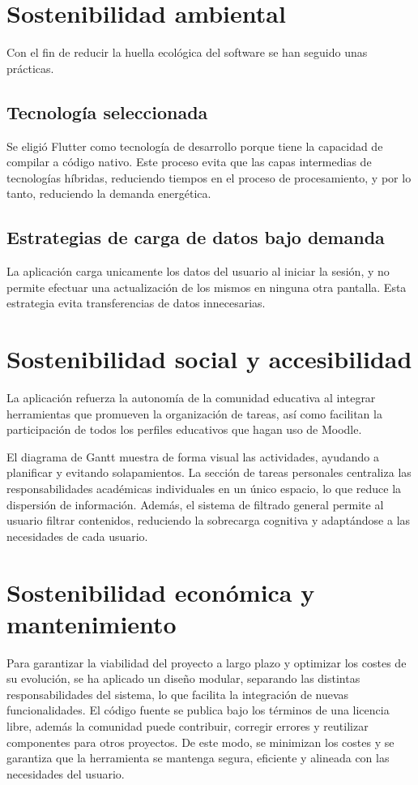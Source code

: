 \section{Sostenibilidad ambiental}
Con el fin de reducir la huella ecológica del software se han seguido unas prácticas.

\subsection{Tecnología seleccionada}
Se eligió Flutter como tecnología de desarrollo porque tiene la capacidad de compilar a código nativo. Este proceso evita que las capas intermedias de tecnologías híbridas, reduciendo tiempos en el proceso de procesamiento, y por lo tanto, reduciendo la demanda energética.

\subsection{Estrategias de carga de datos bajo demanda}
La aplicación carga unicamente los datos del usuario al iniciar la sesión, y no permite efectuar una actualización de los mismos en ninguna otra pantalla. Esta estrategia evita transferencias de datos innecesarias.

\section{Sostenibilidad social y accesibilidad}
La aplicación refuerza la autonomía de la comunidad educativa al integrar herramientas que promueven la organización de tareas, así como facilitan la participación de todos los perfiles educativos que hagan uso de Moodle.

El diagrama de Gantt muestra de forma visual las actividades, ayudando a planificar y evitando solapamientos. La sección de tareas personales centraliza las responsabilidades académicas individuales en un único espacio, lo que reduce la dispersión de información. Además, el sistema de filtrado general permite al usuario filtrar contenidos, reduciendo la sobrecarga cognitiva y adaptándose a las necesidades de cada usuario.

\section{Sostenibilidad económica y mantenimiento}
Para garantizar la viabilidad del proyecto a largo plazo y optimizar los costes de su evolución, se ha aplicado un diseño modular, separando las distintas responsabilidades del sistema, lo que facilita la integración de nuevas funcionalidades. El código fuente se publica bajo los términos de una licencia libre, además la comunidad puede contribuir, corregir errores y reutilizar componentes para otros proyectos. De este modo, se minimizan los costes y se garantiza que la herramienta se mantenga segura, eficiente y alineada con las necesidades del usuario.

